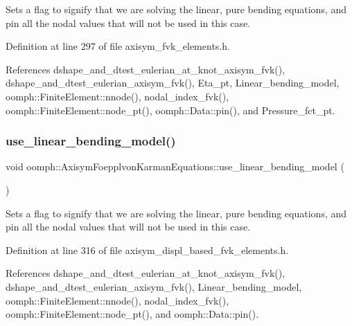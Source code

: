 Sets a flag to signify that we are solving the linear, pure bending equations, and pin all the nodal values that will not be used in this case. 



Definition at line 297 of file axisym\+\_\+fvk\+\_\+elements.\+h.



References dshape\+\_\+and\+\_\+dtest\+\_\+eulerian\+\_\+at\+\_\+knot\+\_\+axisym\+\_\+fvk(), dshape\+\_\+and\+\_\+dtest\+\_\+eulerian\+\_\+axisym\+\_\+fvk(), Eta\+\_\+pt, Linear\+\_\+bending\+\_\+model, oomph\+::\+Finite\+Element\+::nnode(), nodal\+\_\+index\+\_\+fvk(), oomph\+::\+Finite\+Element\+::node\+\_\+pt(), oomph\+::\+Data\+::pin(), and Pressure\+\_\+fct\+\_\+pt.

\mbox{\label{classoomph_1_1AxisymFoepplvonKarmanEquations_abddb3d7358a6039420bf6ed58e7a5547}} 
\subsubsection{\texorpdfstring{use\+\_\+linear\+\_\+bending\+\_\+model()}{use\_linear\_bending\_model()}\hspace{0.1cm}{\footnotesize\ttfamily [2/2]}}
{\footnotesize\ttfamily void oomph\+::\+Axisym\+Foepplvon\+Karman\+Equations\+::use\+\_\+linear\+\_\+bending\+\_\+model (\begin{DoxyParamCaption}{ }\end{DoxyParamCaption})\hspace{0.3cm}{\ttfamily [inline]}}



Sets a flag to signify that we are solving the linear, pure bending equations, and pin all the nodal values that will not be used in this case. 



Definition at line 316 of file axisym\+\_\+displ\+\_\+based\+\_\+fvk\+\_\+elements.\+h.



References dshape\+\_\+and\+\_\+dtest\+\_\+eulerian\+\_\+at\+\_\+knot\+\_\+axisym\+\_\+fvk(), dshape\+\_\+and\+\_\+dtest\+\_\+eulerian\+\_\+axisym\+\_\+fvk(), Linear\+\_\+bending\+\_\+model, oomph\+::\+Finite\+Element\+::nnode(), nodal\+\_\+index\+\_\+fvk(), oomph\+::\+Finite\+Element\+::node\+\_\+pt(), and oomph\+::\+Data\+::pin().



